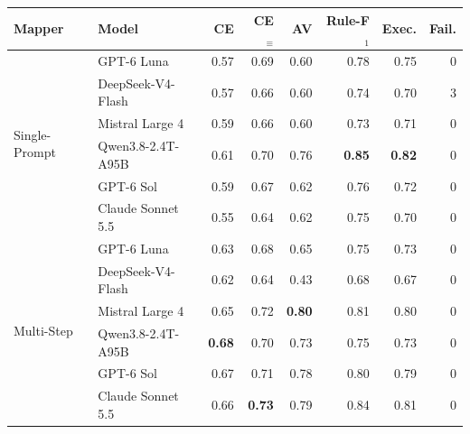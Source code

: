 \begin{tabular}{llrrrrrr}
\toprule
\textbf{Mapper} & \textbf{Model} & CE & CE$_{\equiv}$ & AV & Rule-F$_1$ & Exec. & Fail. \\
\midrule
\multirow{6}{*}{Single-Prompt} & GPT-6 Luna & 0.57 & 0.69 & 0.60 & 0.78 & 0.75 & 0 \\
 & DeepSeek-V4-Flash & 0.57 & 0.66 & 0.60 & 0.74 & 0.70 & 3 \\
 & Mistral Large 4 & 0.59 & 0.66 & 0.60 & 0.73 & 0.71 & 0 \\
 & Qwen3.8-2.4T-A95B & 0.61 & 0.70 & 0.76 & \textbf{0.85} & \textbf{0.82} & 0 \\
 & GPT-6 Sol & 0.59 & 0.67 & 0.62 & 0.76 & 0.72 & 0 \\
 & Claude Sonnet 5.5 & 0.55 & 0.64 & 0.62 & 0.75 & 0.70 & 0 \\
\midrule
\multirow{6}{*}{Multi-Step} & GPT-6 Luna & 0.63 & 0.68 & 0.65 & 0.75 & 0.73 & 0 \\
 & DeepSeek-V4-Flash & 0.62 & 0.64 & 0.43 & 0.68 & 0.67 & 0 \\
 & Mistral Large 4 & 0.65 & 0.72 & \textbf{0.80} & 0.81 & 0.80 & 0 \\
 & Qwen3.8-2.4T-A95B & \textbf{0.68} & 0.70 & 0.73 & 0.75 & 0.73 & 0 \\
 & GPT-6 Sol & 0.67 & 0.71 & 0.78 & 0.80 & 0.79 & 0 \\
 & Claude Sonnet 5.5 & 0.66 & \textbf{0.73} & 0.79 & 0.84 & 0.81 & 0 \\
\bottomrule
\end{tabular}
